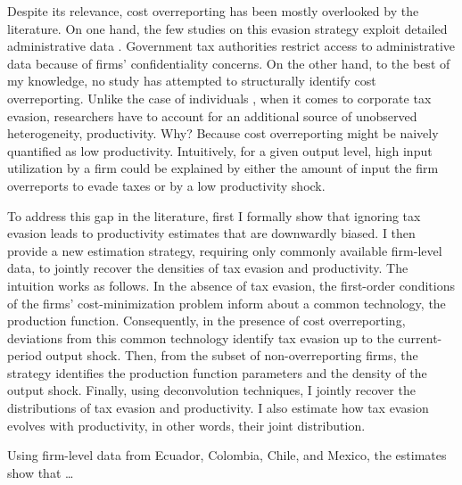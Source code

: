 \documentclass[
  12pt]{article}
\theoremstyle{definition}
\theoremstyle{remark}
\begin{document}
Despite its relevance, cost overreporting has been mostly overlooked by
the literature. On one hand, the few studies on this evasion strategy
exploit detailed administrative data \citep{Zumaya2021, Carrillo2022}.
Government tax authorities restrict access to administrative data
because of firms' confidentiality concerns. On the other hand, to the
best of my knowledge, no study has attempted to structurally identify
cost overreporting. Unlike the case of individuals
\citep{Pissarides1989, Paulus2015}, when it comes to corporate tax
evasion, researchers have to account for an additional source of
unobserved heterogeneity, productivity. Why? Because cost overreporting
might be naively quantified as low productivity. Intuitively, for a
given output level, high input utilization by a firm could be explained
by either the amount of input the firm overreports to evade taxes or by
a low productivity shock.

To address this gap in the literature, first I formally show that
ignoring tax evasion leads to productivity estimates that are downwardly
biased. I then provide a new estimation strategy, requiring only
commonly available firm-level data, to jointly recover the densities of
tax evasion and productivity. The intuition works as follows. In the
absence of tax evasion, the first-order conditions of the firms'
cost-minimization problem inform about a common technology, the
production function. Consequently, in the presence of cost
overreporting, deviations from this common technology identify tax
evasion up to the current-period output shock. Then, from the subset of
non-overreporting firms, the strategy identifies the production function
parameters and the density of the output shock. Finally, using
deconvolution techniques, I jointly recover the distributions of tax
evasion and productivity. I also estimate how tax evasion evolves with
productivity, in other words, their joint distribution.

Using firm-level data from Ecuador, Colombia, Chile, and Mexico, the
estimates show that \ldots{}
\end{document}
